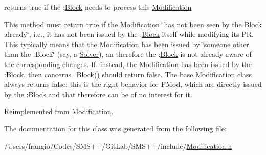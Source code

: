 returns true if the \+:\mbox{\hyperlink{class_s_m_spp__di__unipi__it_1_1_block}{Block}} needs to process this \mbox{\hyperlink{class_s_m_spp__di__unipi__it_1_1_modification}{Modification}} 

This method must return true if the \mbox{\hyperlink{class_s_m_spp__di__unipi__it_1_1_modification}{Modification}} \char`\"{}has not been seen by
the Block already\char`\"{}, i.\+e., it has not been issued by the \+:\mbox{\hyperlink{class_s_m_spp__di__unipi__it_1_1_block}{Block}} itself while modifying its PR. This typically means that the \mbox{\hyperlink{class_s_m_spp__di__unipi__it_1_1_modification}{Modification}} has been issued by \char`\"{}someone other than the \+:\+Block\char`\"{} (say, a \mbox{\hyperlink{class_s_m_spp__di__unipi__it_1_1_solver}{Solver}}), an therefore the \+:\mbox{\hyperlink{class_s_m_spp__di__unipi__it_1_1_block}{Block}} is not already aware of the corresponding changes. If, instead, the \mbox{\hyperlink{class_s_m_spp__di__unipi__it_1_1_modification}{Modification}} has been issued by the \+:\mbox{\hyperlink{class_s_m_spp__di__unipi__it_1_1_block}{Block}}, then \mbox{\hyperlink{class_s_m_spp__di__unipi__it_1_1_modification_a22fe0cccfc755cfd89b240587d1f1cad}{concerns\+\_\+\+Block()}} should return false. The base \mbox{\hyperlink{class_s_m_spp__di__unipi__it_1_1_modification}{Modification}} class always returns false\+: this is the right behavior for P\+Mod, which are directly issued by the \+:\mbox{\hyperlink{class_s_m_spp__di__unipi__it_1_1_block}{Block}} and that therefore can be of no interest for it. 

Reimplemented from \mbox{\hyperlink{class_s_m_spp__di__unipi__it_1_1_modification_a22fe0cccfc755cfd89b240587d1f1cad}{Modification}}.



The documentation for this class was generated from the following file\+:\begin{DoxyCompactItemize}
\item 
/\+Users/frangio/\+Codes/\+S\+M\+S++/\+Git\+Lab/\+S\+M\+S++/include/\mbox{\hyperlink{_modification_8h}{Modification.\+h}}\end{DoxyCompactItemize}
